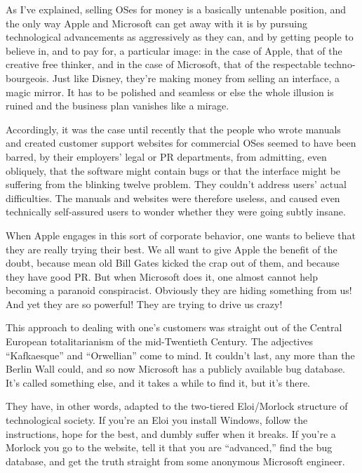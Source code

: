 \documentclass[
  fontsize=11pt,
  paper=landscape,
  twocolumn=true,
  pagesize=pdftex,
  headings=small,
  DIV=15,
  ]{scrartcl}
\begin{document}
As I've explained, selling OSes for money is a basically untenable
position, and the only way Apple and Microsoft can get away with it is
by pursuing technological advancements as aggressively as they can, and
by getting people to believe in, and to pay for, a particular image: in
the case of Apple, that of the creative free thinker, and in the case of
Microsoft, that of the respectable techno-bourgeois. Just like Disney,
they're making money from selling an interface, a magic mirror. It has
to be polished and seamless or else the whole illusion is ruined and the
business plan vanishes like a mirage.

Accordingly, it was the case until recently that the people who wrote
manuals and created customer support websites for commercial OSes seemed
to have been barred, by their employers' legal or PR departments, from
admitting, even obliquely, that the software might contain bugs or that
the interface might be suffering from the blinking twelve problem. They
couldn't address users' actual difficulties. The manuals and websites
were therefore useless, and caused even technically self-assured users
to wonder whether they were going subtly insane.

When Apple engages in this sort of corporate behavior, one wants to
believe that they are really trying their best. We all want to give
Apple the benefit of the doubt, because mean old Bill Gates kicked the
crap out of them, and because they have good PR. But when Microsoft does
it, one almost cannot help becoming a paranoid conspiracist. Obviously
they are hiding something from us! And yet they are so powerful! They
are trying to drive us crazy!

This approach to dealing with one's customers was straight out of the
Central European totalitarianism of the mid-Twentieth Century. The
adjectives ``Kafkaesque'' and ``Orwellian'' come to mind. It couldn't
last, any more than the Berlin Wall could, and so now Microsoft has a
publicly available bug database. It's called something else, and it
takes a while to find it, but it's there.

They have, in other words, adapted to the two-tiered Eloi/Morlock
structure of technological society. If you're an Eloi you install
Windows, follow the instructions, hope for the best, and dumbly suffer
when it breaks. If you're a Morlock you go to the website, tell it that
you are ``advanced,'' find the bug database, and get the truth straight
from some anonymous Microsoft engineer.
\end{document}
